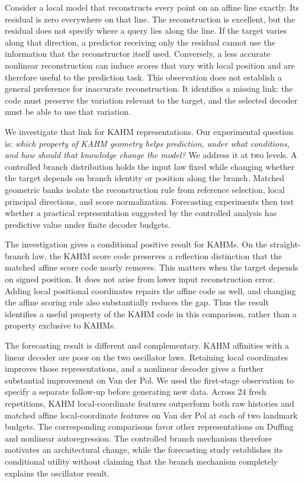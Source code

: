 \documentclass[10pt]{article}
\begin{document}
Consider a local model that reconstructs every point on an affine line
exactly. Its residual is zero everywhere on that line. The reconstruction is
excellent, but the residual does not specify where a query lies along the
line. If the target varies along that direction, a predictor receiving only
the residual cannot use the information that the reconstructor itself used.
Conversely, a less accurate nonlinear reconstruction can induce scores that
vary with local position and are therefore useful to the prediction task.
This observation does not establish a general preference for inaccurate
reconstruction. It identifies a missing link: the code must preserve the
variation relevant to the target, and the selected decoder must be able to
use that variation.

We investigate that link for KAHM representations. Our experimental question
is: \emph{which property of KAHM geometry helps prediction, under what
conditions, and how should that knowledge change the model?} We address it
at two levels. A controlled branch distribution holds the input law fixed
while changing whether the target depends on branch identity or position
along the branch. Matched geometric banks isolate the reconstruction rule
from reference selection, local principal directions, and score
normalization. Forecasting experiments then test whether a practical
representation suggested by the controlled analysis has predictive value
under finite decoder budgets.

The investigation gives a conditional positive result for KAHMs. On the
straight-branch law, the KAHM score code preserves a reflection distinction
that the matched affine score code nearly removes. This matters when the
target depends on signed position. It does not arise from lower input
reconstruction error. Adding local positional coordinates repairs the affine
code as well, and changing the affine scoring rule also substantially reduces
the gap. Thus the result identifies a useful property of the KAHM code in
this comparison, rather than a property exclusive to KAHMs.

The forecasting result is different and complementary. KAHM affinities with
a linear decoder are poor on the two oscillator laws. Retaining local
coordinates improves those representations, and a nonlinear decoder gives
a further substantial improvement on Van der Pol. We used the first-stage
observation to specify a separate follow-up before generating new data.
Across 24 fresh repetitions, KAHM local-coordinate features outperform both
raw histories and matched affine local-coordinate features on Van der Pol
at each of two landmark budgets. The corresponding comparisons favor other
representations on Duffing and nonlinear autoregression. The controlled
branch mechanism therefore motivates an architectural change, while the
forecasting study establishes its conditional utility without claiming that
the branch mechanism completely explains the oscillator result.
\end{document}
